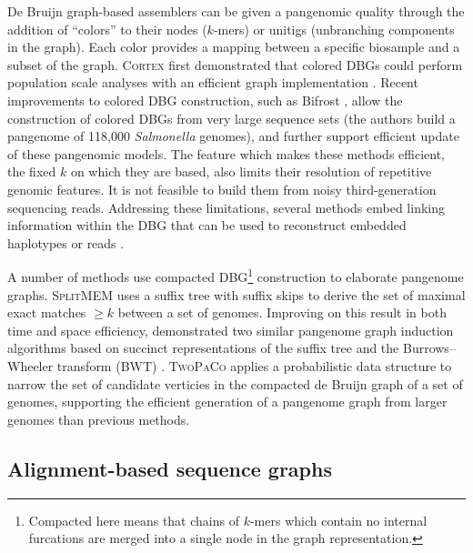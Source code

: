 De Bruijn graph-based assemblers can be given a pangenomic quality through the addition of ``colors'' to their nodes ($k$-mers) or unitigs (unbranching components in the graph).
Each color provides a mapping between a specific biosample and a subset of the graph.
\textsc{Cortex} first demonstrated that colored DBGs could perform population scale analyses with an efficient graph implementation \cite{Iqbal_2012}.
Recent improvements to colored DBG construction, such as Bifrost \cite{holley2019bifrost}, allow the construction of colored DBGs from very large sequence sets (the authors build a pangenome of 118,000 \emph{Salmonella} genomes), and further support efficient update of these pangenomic models.
The feature which makes these methods efficient, the fixed $k$ on which they are based, also limits their resolution of repetitive genomic features.
It is not feasible to build them from noisy third-generation sequencing reads.
Addressing these limitations, several methods embed linking information within the DBG that can be used to reconstruct embedded haplotypes or reads \cite{Bolger_2017,Turner_2018}.

A number of methods use compacted DBG\footnote{Compacted here means that chains of $k$-mers which contain no internal furcations are merged into a single node in the graph representation.} construction to elaborate pangenome graphs.
\textsc{SplitMEM} \cite{Marcus_2014} uses a suffix tree with suffix skips to derive the set of maximal exact matches $\geq k$ between a set of genomes.
Improving on this result in both time and space efficiency, \cite{Baier_2015} demonstrated two similar pangenome graph induction algorithms based on succinct representations of the suffix tree and the Burrows--Wheeler transform (BWT) \cite{Burrows_1994}.
\textsc{TwoPaCo} \cite{Minkin_2016} applies a probabilistic data structure to narrow the set of candidate verticies in the compacted de Bruijn graph of a set of genomes, supporting the efficient generation of a pangenome graph from larger genomes than previous methods.

\subsection{Alignment-based sequence graphs}

